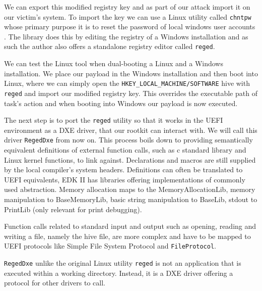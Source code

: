 We can export this modified registry key and as part of our attack import it on our victim's system. To import the key we can use a Linux utility called \lstinline{chntpw} whose primary purpose it is to reset the password of local windows user accounts \cite{chntpw}. The library does this by editing the registry of a Windows installation and as such the author also offers a standalone registry editor called \lstinline{reged}.

We can test the Linux tool when dual-booting a Linux and a Windows installation. We place our payload in the Windows installation and then boot into Linux, where we can simply open the \lstinline{HKEY_LOCAL_MACHINE/SOFTWARE} hive with \lstinline{reged} and import our modified registry key.
This overrides the executable path of task's action and when booting into Windows our payload is now executed.


The next step is to port the \lstinline{reged} utility so that it works in the UEFI environment as a DXE driver, that our rootkit can interact with. We will call this driver \lstinline{RegedDxe} from now on.
This process boils down to providing semantically equivalent definitions of external function calls, such as c standard library and Linux kernel functions, to link against. Declarations and macros are still supplied by the local compiler's system headers. Definitions can often be translated to \ac{UEFI} equivalents, \ac{EDK} II has libraries offering implementations of commonly used abstraction.
Memory allocation maps to the MemoryAllocationLib, memory manipulation to BaseMemoryLib, basic string manipulation to BaseLib, stdout to PrintLib (only relevant for print debugging).

Function calls related to standard input and output such as opening, reading and writing a file, namely the hive file, are more complex and have to be mapped to \ac{UEFI} protocols like Simple File System Protocol and \lstinline{FileProtocol}.


\lstinline{RegedDxe} unlike the original Linux utility \lstinline{reged} is not an application that is executed within a working directory. Instead, it is a \ac{DXE} driver offering a protocol for other drivers to call.

